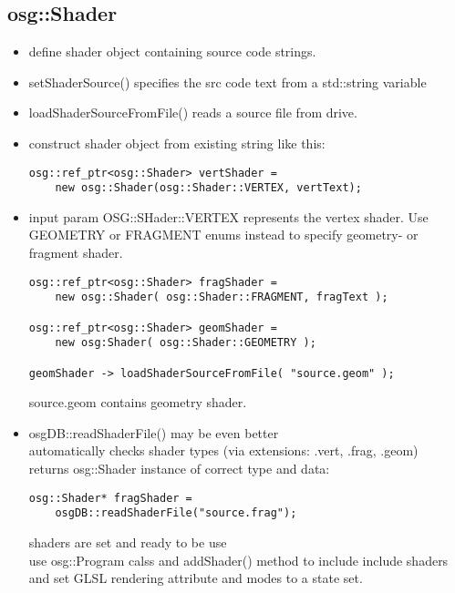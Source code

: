 \documentclass[a4paper,12pt]{book}
\begin{document}
\subsection{osg::Shader}
\begin{itemize}
\item define shader object containing source code strings.
\item setShaderSource() specifies the src code text from a std::string variable
\item loadShaderSourceFromFile() reads a source file from drive.

\item construct shader object from existing string like this:

\begin{lstlisting}
osg::ref_ptr<osg::Shader> vertShader = 
	new osg::Shader(osg::Shader::VERTEX, vertText);
\end{lstlisting}

\item input param OSG::SHader::VERTEX represents the vertex shader. Use GEOMETRY or FRAGMENT enums instead to specify geometry- or fragment shader.

\begin{lstlisting}
osg::ref_ptr<osg::Shader> fragShader = 
	new osg::Shader( osg::Shader::FRAGMENT, fragText );
	
osg::ref_ptr<osg::Shader> geomShader = 
	new osg:Shader( osg::Shader::GEOMETRY );
	
geomShader -> loadShaderSourceFromFile( "source.geom" );

\end{lstlisting}
\textrightarrow source.geom contains geometry shader.

\item osgDB::readShaderFile() may be even better\\
\textrightarrow automatically checks shader types (via extensions: .vert, .frag, .geom)\\
\textrightarrow returns osg::Shader instance of correct type and data:\\
\begin{lstlisting}
osg::Shader* fragShader =
	osgDB::readShaderFile("source.frag");

\end{lstlisting}
\textrightarrow shaders are set and ready to be use\\
\textrightarrow use osg::Program calss and addShader() method to include include shaders and set GLSL rendering attribute and modes to a state set.\\


\end{itemize}
\end{document}
